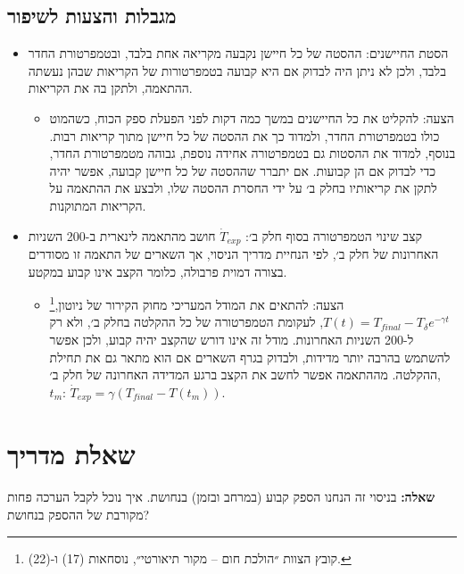 \documentclass[10pt,a4paper]{article}
\begin{document}
\subsection*{מגבלות והצעות לשיפור}
\begin{itemize}\setlength{\itemsep}{2pt}\setlength{\parskip}{0pt}
  \item הסטת החיישנים: ההסטה של כל חיישן נקבעה מקריאה אחת בלבד, ובטמפרטורת החדר בלבד, ולכן לא ניתן היה לבדוק אם היא קבועה בטמפרטורות של הקריאות שבהן נעשתה ההתאמה, ולתקן בה את הקריאות.
  \begin{itemize}\setlength{\itemsep}{0pt}\setlength{\parskip}{0pt}
    \item הצעה: להקליט את כל החיישנים במשך כמה דקות לפני הפעלת ספק הכוח, כשהמוט כולו בטמפרטורת החדר, ולמדוד כך את ההסטה של כל חיישן מתוך קריאות רבות. בנוסף, למדוד את ההסטות גם בטמפרטורה אחידה נוספת, גבוהה מטמפרטורת החדר, כדי לבדוק אם הן קבועות. אם יתברר שההסטה של כל חיישן קבועה, אפשר יהיה לתקן את קריאותיו בחלק ב׳ על ידי החסרת ההסטה שלו, ולבצע את ההתאמה על הקריאות המתוקנות.
  \end{itemize}
  \item קצב שינוי הטמפרטורה בסוף חלק ב׳: $\dot{T}_{exp}$ חושב מהתאמה לינארית ב-200 השניות האחרונות של חלק ב׳, לפי הנחיית מדריך הניסוי, אך השארים של התאמה זו מסודרים בצורה דמוית פרבולה, כלומר הקצב אינו קבוע במקטע.
  \begin{itemize}\setlength{\itemsep}{0pt}\setlength{\parskip}{0pt}
    \item הצעה: להתאים את המודל המעריכי מחוק הקירור של ניוטון,\footnote{קובץ הצוות ״הולכת חום -- מקור תיאורטי״, נוסחאות (17) ו-(22).} $T(t) = T_{final} - T_\delta e^{-\gamma t}$, לעקומת הטמפרטורה של כל ההקלטה בחלק ב׳, ולא רק ל-200 השניות האחרונות. מודל זה אינו דורש שהקצב יהיה קבוע, ולכן אפשר להשתמש בהרבה יותר מדידות, ולבדוק בגרף השארים אם הוא מתאר גם את תחילת ההקלטה. מההתאמה אפשר לחשב את הקצב ברגע המדידה האחרונה של חלק ב׳, $t_m$: $\dot{T}_{exp} = \gamma\left(T_{final} - T(t_m)\right)$.
  \end{itemize}
\end{itemize}

\section*{שאלת מדריך}
\textbf{שאלה:} בניסוי זה הנחנו הספק קבוע (במרחב ובזמן) בנחושת. איך נוכל לקבל הערכה פחות מקורבת של ההספק בנחושת?
\end{document}
